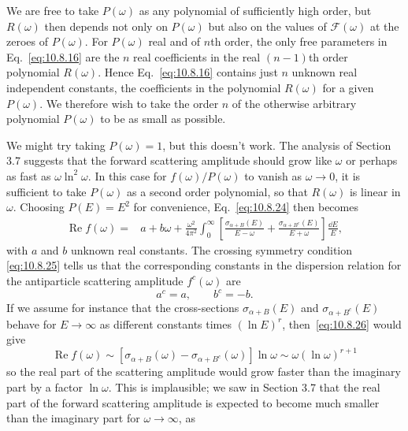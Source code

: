 We are free to take $P(\omega)$ as any polynomial of sufficiently high order,
but $R(\omega)$ then depends not only on $P(\omega)$ but also on the values
of $\mathcal F(\omega)$ at the zeroes of $P(\omega)$. For $P(\omega)$ real
and of $n$th order, the only free parameters in Eq.~\eqref{eq:10.8.16} are
the $n$ real coefficients in the real $(n-1)$th order polynomial $R(\omega)$.
Hence Eq.~\eqref{eq:10.8.16} contains just $n$ unknown real independent
constants, the coefficients in the polynomial $R(\omega)$ for a given
$P(\omega)$. We therefore wish to take the order $n$ of the otherwise
arbitrary polynomial $P(\omega)$ to be as small as possible.

We might try taking $P(\omega)=1$, but this doesn't work. The analysis of
Section 3.7 suggests that the forward scattering amplitude should grow like
$\omega$ or perhaps as fast as $\omega\ln^2\omega$. In this case for
$f(\omega)/P(\omega)$ to vanish as $\omega\to0$, it is sufficient to take
$P(\omega)$ as a second order polynomial, so that $R(\omega)$ is linear in
$\omega$. Choosing $P(E)=E^2$ for convenience, Eq.~\eqref{eq:10.8.24}
then becomes
\begin{align}
  \operatorname{Re}f(\omega)={}&a+b\omega
  +\frac{\omega^2}{4\pi^2}\int_0^\infty
  \left[\frac{\sigma_{\alpha+B}(E)}{E-\omega}
  +\frac{\sigma_{\alpha+B^c}(E)}{E+\omega}\right]\frac{\dd E}{E},
  \tag{10.8.26}\label{eq:10.8.26}
\end{align}
with $a$ and $b$ unknown real constants. The crossing symmetry condition
\eqref{eq:10.8.25} tells us that the corresponding constants in the dispersion
relation for the antiparticle scattering amplitude $f^c(\omega)$ are
\begin{equation}
  a^c=a,\qquad b^c=-b.
  \tag{10.8.27}\label{eq:10.8.27}
\end{equation}
If we assume for instance that the cross-sections $\sigma_{\alpha+B}(E)$ and
$\sigma_{\alpha+B^c}(E)$ behave for $E\to\infty$ as different constants
times $(\ln E)^r$, then~\eqref{eq:10.8.26} would give
\begin{equation}
  \operatorname{Re}f(\omega)\sim
  [\sigma_{\alpha+B}(\omega)-\sigma_{\alpha+B^c}(\omega)]\ln\omega
  \sim\omega(\ln\omega)^{r+1}
  \tag{10.8.28}\label{eq:10.8.28}
\end{equation}
so the real part of the scattering amplitude would grow faster than the
imaginary part by a factor $\ln\omega$. This is implausible; we saw in Section
3.7 that the real part of the forward scattering amplitude is expected to
become much smaller than the imaginary part for $\omega\to\infty$, as
